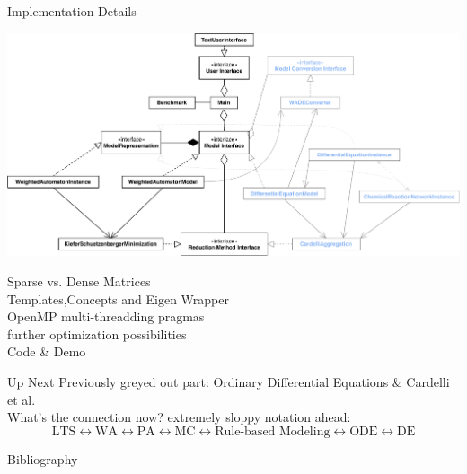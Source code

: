 \documentclass[rgb, pdf]{beamer}
\begin{document}
    
    \begin{frame}[allowframebreaks]{Implementation Details}
        \begin{center}
                \includegraphics[keepaspectratio, height=0.8\textheight, width=\textwidth]{img/class_compact_wa.pdf}
        \end{center}
        \framebreak
        
        Sparse vs. Dense Matrices \\ \vspace{0.5cm}
        Templates,Concepts and Eigen Wrapper \\ \vspace{0.5cm}
        OpenMP multi-threadding pragmas \\ \vspace{0.5cm}
        further optimization possibilities \\ \vspace{0.5cm}
        Code \& Demo \\ \vspace{0.5cm}
    \end{frame}
    
    
    \begin{frame}{Up Next}
        Previously greyed out part: Ordinary Differential Equations \& Cardelli et al.~\autocite{Cardelli2017MaximalAO} \\ \vspace{0.5cm}
        What's the connection now? \alert{extremely sloppy notation ahead:} \\
        \[ \text{LTS} \leftrightarrow \text{WA} \leftrightarrow \text{PA} \leftrightarrow \text{MC} \leftrightarrow \text{Rule-based Modeling} \leftrightarrow \text{ODE} \leftrightarrow \text{DE} \]
    \end{frame}
  
    
    \begin{frame}{Bibliography}
        \printbibliography
    \end{frame}
\end{document}
